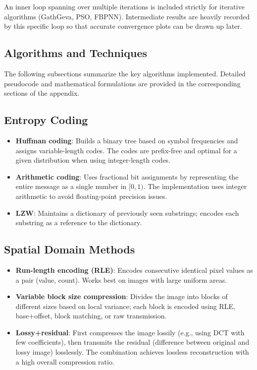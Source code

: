 An inner loop spanning over multiple iterations is included strictly for iterative algorithms (GathGeva, PSO, FBPNN). Intermediate results are heavily recorded by this specific loop so that accurate convergence plots can be drawn up later.






\subsection{Algorithms and Techniques}

The following subsections summarize the key algorithms implemented. Detailed pseudocode and mathematical formulations are provided in the corresponding sections of the appendix.

\subsection{Entropy Coding}

\begin{itemize}
    \item \textbf{Huffman coding}: Builds a binary tree based on symbol frequencies and assigns variable-length codes. The codes are prefix-free and optimal for a given distribution when using integer-length codes.
    
    \item \textbf{Arithmetic coding}: Uses fractional bit assignments by representing the entire message as a single number in \([0,1)\). The implementation uses integer arithmetic to avoid floating-point precision issues.
    
    \item \textbf{LZW}: Maintains a dictionary of previously seen substrings; encodes each substring as a reference to the dictionary.
\end{itemize}

\subsection{Spatial Domain Methods}

\begin{itemize}
    \item \textbf{Run-length encoding (RLE)}: Encodes consecutive identical pixel values as a pair (value, count). Works best on images with large uniform areas.
    
    \item \textbf{Variable block size compression}: Divides the image into blocks of different sizes based on local variance; each block is encoded using RLE, base+offset, block matching, or raw transmission.
    
    \item \textbf{Lossy+residual}: First compresses the image lossily (e.g., using DCT with few coefficients), then transmits the residual (difference between original and lossy image) losslessly. The combination achieves lossless reconstruction with a high overall compression ratio.
\end{itemize}

